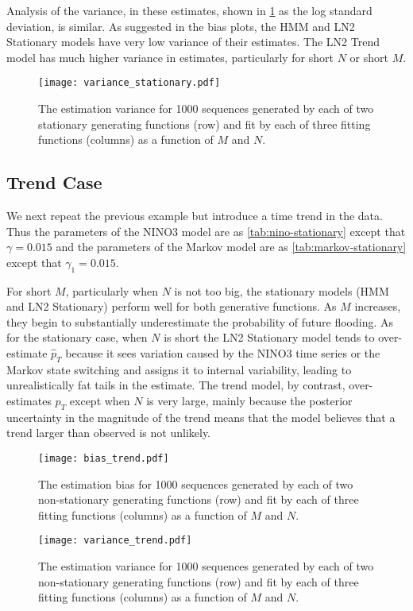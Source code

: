 \documentclass[12pt]{article}
\begin{document}
Analysis of the variance, in these estimates, shown in \cref{fig:stationary-variance} as the log standard deviation, is similar.
As suggested in the bias plots, the HMM and LN2 Stationary models have very low variance of their estimates.
The LN2 Trend model has much higher variance in estimates, particularly for short \(N\) or short \(M\).
\begin{figure}[ht]
  \texttt{[image: variance\_stationary.pdf]}
  \caption{The estimation variance for 1000 sequences generated by each of two stationary generating functions (row) and fit by each of three fitting functions (columns) as a function of \(M\) and \(N\).\label{fig:stationary-variance}}
\end{figure}

\subsection{Trend Case}

We next repeat the previous example but introduce a time trend in the data.
Thus the parameters of the NINO3 model are as \cref{tab:nino-stationary} except that $\gamma=0.015$ and the parameters of the Markov model are as \cref{tab:markov-stationary} except that $\gamma_1 = 0.015$.

For short \(M\), particularly when \(N\) is not too big, the stationary models (HMM and LN2 Stationary) perform well for both generative functions.
As \(M\) increases, they begin to substantially underestimate the probability of future flooding.
As for the stationary case, when \(N\) is short the LN2 Stationary model tends to over-estimate $\hat{p}_T$ because it sees variation caused by the NINO3 time series or the Markov state switching and assigns it to internal variability, leading to unrealistically fat tails in the estimate.
The trend model, by contrast, over-estimates $p_T$ except when $N$ is very large, mainly because the posterior uncertainty in the magnitude of the trend means that the model believes that a trend larger than observed is not unlikely.
\begin{figure}[ht]
  \texttt{[image: bias\_trend.pdf]}
  \caption{The estimation bias for 1000 sequences generated by each of two non-stationary generating functions (row) and fit by each of three fitting functions (columns) as a function of \(M\) and \(N\).\label{fig:stationary-bias}}
\end{figure}

\begin{figure}[ht]
  \texttt{[image: variance\_trend.pdf]}
  \caption{The estimation variance for 1000 sequences generated by each of two non-stationary generating functions (row) and fit by each of three fitting functions (columns) as a function of \(M\) and \(N\).\label{fig:stationary-bias}}
\end{figure}
\end{document}
